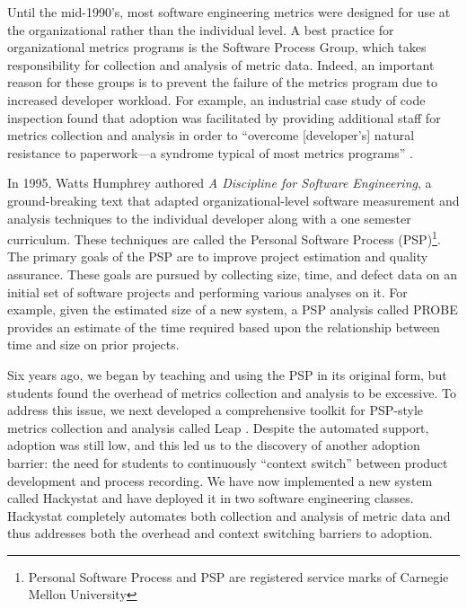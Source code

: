 \documentclass[12pt]{article}
\begin{document}

Until the mid-1990's, most software engineering metrics were designed for
use at the organizational rather than the individual level.  A best
practice for organizational metrics programs is the Software Process
Group, which takes responsibility for collection and analysis of metric
data.  Indeed, an important reason for these groups is to prevent the
failure of the metrics program due to increased developer workload. For
example, an industrial case study of code inspection found that adoption
was facilitated by providing additional staff for metrics collection and
analysis in order to ``overcome [developer's] natural resistance to
paperwork---a syndrome typical of most metrics programs'' \cite{Weller93}.

In 1995, Watts Humphrey authored {\em A Discipline for Software Engineering},
a ground-breaking text that adapted organizational-level software
measurement and analysis techniques to the individual developer along with
a one semester curriculum. These techniques are called the Personal
Software Process (PSP)\footnote{Personal Software Process and PSP are
  registered service marks of Carnegie Mellon University}.  The primary
goals of the PSP are to improve project estimation and quality assurance.
These goals are pursued by collecting size, time, and defect data on an
initial set of software projects and performing various analyses on it. For
example, given the estimated size of a new system, a PSP analysis called
PROBE provides an estimate of the time required based upon the relationship
between time and size on prior projects.

Six years ago, we began by teaching and using the PSP
in its original form, but students found the overhead of metrics collection
and analysis to be excessive. To address this issue, we next developed a
comprehensive toolkit for PSP-style metrics collection and analysis called
Leap \cite{csdl2-00-01,csdl2-00-03}. Despite the automated support,
adoption was still low, and this led us to the discovery of another
adoption barrier: the need for students to continuously ``context switch''
between product development and process recording. We have now implemented
a new system called Hackystat and have deployed it in two software
engineering classes. Hackystat completely automates both collection and
analysis of metric data and thus addresses both the overhead and context
switching barriers to adoption. 

\end{document}
